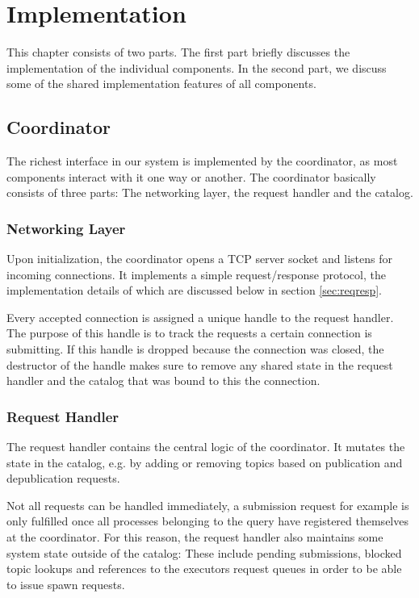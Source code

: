 \chapter{Implementation}\label{ch:impl}

This chapter consists of two parts. The first part
briefly discusses the implementation of the individual components.
In the second part, we discuss some of the shared implementation features
of all components.

\section{Coordinator}

The richest interface in our system is implemented by the coordinator, as most
components interact with it one way or another. The coordinator basically
consists of three parts: The networking layer, the request handler and
the catalog.

\subsection{Networking Layer}

Upon initialization, the coordinator opens a TCP server socket and listens
for incoming connections. It implements a simple request/response protocol, the
implementation details of which are discussed below in section \ref{sec:reqresp}.

Every accepted connection is assigned a unique handle to the request handler.
The purpose of this handle is to track the requests a certain connection is
submitting. If this handle is dropped because the connection was closed, the
destructor of the handle makes sure to remove any shared state in the request
handler and the catalog that was bound to this the connection.

\subsection{Request Handler}

The request handler contains the central logic of the coordinator. It mutates
the state in the catalog, e.g. by adding or removing topics based on publication
and depublication requests. 

Not all requests can be handled immediately, a submission request for example
is only fulfilled once all processes belonging to the query have registered
themselves at the coordinator. 
For this reason,
the request handler also maintains some system state outside of the catalog:
These include pending submissions, blocked topic lookups and references to the
executors request queues in order to be able to issue spawn requests.



